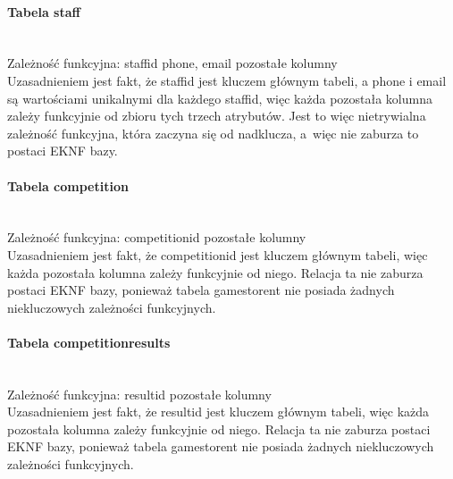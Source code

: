 \documentclass{article}
\begin{document}
	\paragraph{Tabela staff}\mbox{}\vspace{0.2cm} \\
	Zależność funkcyjna: \textbraceleft staff\textunderscore id phone, email\textbraceright \mbox{} \textrightarrow \mbox{} pozostałe kolumny \vspace{0.2cm} \\
	\noindent Uzasadnieniem jest fakt, że staff\textunderscore id jest kluczem głównym tabeli, a phone i email są wartościami unikalnymi dla każdego staff\textunderscore id, więc każda pozostała kolumna zależy funkcyjnie od zbioru tych trzech atrybutów. Jest to więc nietrywialna zależność funkcyjna, która zaczyna się od nadklucza, a~więc nie zaburza to postaci EKNF bazy.
	
	\paragraph{Tabela competition}\mbox{}\vspace{0.2cm} \\
	Zależność funkcyjna: competition\textunderscore id\mbox{} \textrightarrow \mbox{} pozostałe kolumny \vspace{0.2cm} \\
	\noindent Uzasadnieniem jest fakt, że competition\textunderscore id jest kluczem głównym tabeli, więc każda pozostała kolumna zależy funkcyjnie od niego. Relacja ta nie zaburza postaci EKNF bazy, ponieważ tabela games\textunderscore to\textunderscore rent nie posiada żadnych niekluczowych zależności funkcyjnych.
	
	\paragraph{Tabela competition\textunderscore results}\mbox{}\vspace{0.2cm} \\
	Zależność funkcyjna: result\textunderscore id\mbox{} \textrightarrow \mbox{} pozostałe kolumny \vspace{0.2cm} \\
	\noindent Uzasadnieniem jest fakt, że result\textunderscore id jest kluczem głównym tabeli, więc każda pozostała kolumna zależy funkcyjnie od niego. Relacja ta nie zaburza postaci EKNF bazy, ponieważ tabela games\textunderscore to\textunderscore rent nie posiada żadnych niekluczowych zależności funkcyjnych.\\
	
\end{document}
